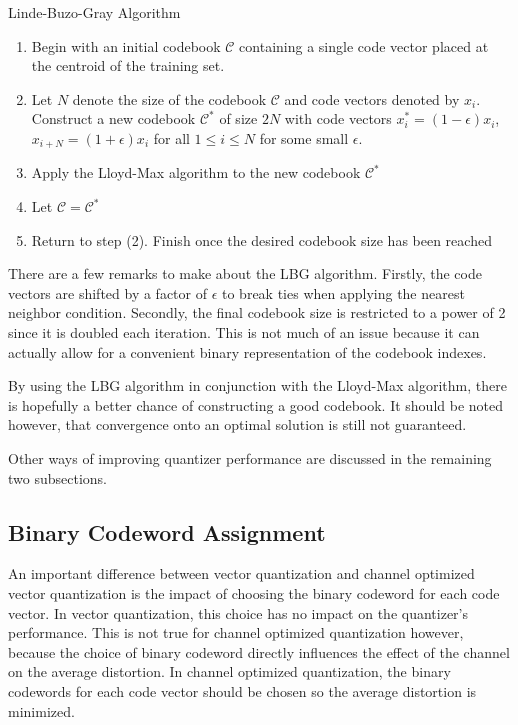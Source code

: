 \documentclass[10pt]{article}
\begin{document}
{\sc \noindent Linde-Buzo-Gray Algorithm}
\begin{enumerate}
\item Begin with an initial codebook $\mathcal{C}$ containing a single code vector placed at the centroid of the training set.
  \item Let $N$ denote the size of the codebook $\mathcal{C}$ and code vectors denoted by $x_i$. Construct a new codebook $\mathcal{C}^*$ of size $2N$ with code vectors $x_i^* = (1-\epsilon)x_i$, $x_{i+N} = (1+\epsilon)x_i$ for all $1 \le i \le N$ for some small $\epsilon$.
\item Apply the Lloyd-Max algorithm to the new codebook $\mathcal{C}^*$
\item Let $\mathcal{C}=\mathcal{C}^*$
\item Return to step (2). Finish once the desired codebook size has been reached
\end{enumerate}
There are a few remarks to make about the LBG algorithm. Firstly, the code vectors are shifted by a factor of $\epsilon$ to break ties when applying the nearest neighbor condition. Secondly, the final codebook size is restricted to a power of 2 since it is doubled each iteration. This is not much of an issue because it can actually allow for a convenient binary representation of the codebook indexes.

By using the LBG algorithm in conjunction with the Lloyd-Max algorithm, there is hopefully a better chance of constructing a good codebook. It should be noted however, that convergence onto an optimal solution is still not guaranteed.

Other ways of improving quantizer performance are discussed in the remaining two subsections.

\subsection{Binary Codeword Assignment}
\label{sec:code_assign}
An important difference between vector quantization and channel optimized vector quantization is the impact of choosing the binary codeword for each code vector. In vector quantization, this choice has no impact on the quantizer's performance. This is not true for channel optimized quantization however, because the choice of binary codeword directly influences the effect of the channel on the average distortion. In channel optimized quantization, the binary codewords for each code vector should be chosen so the average distortion is minimized.
\end{document}
